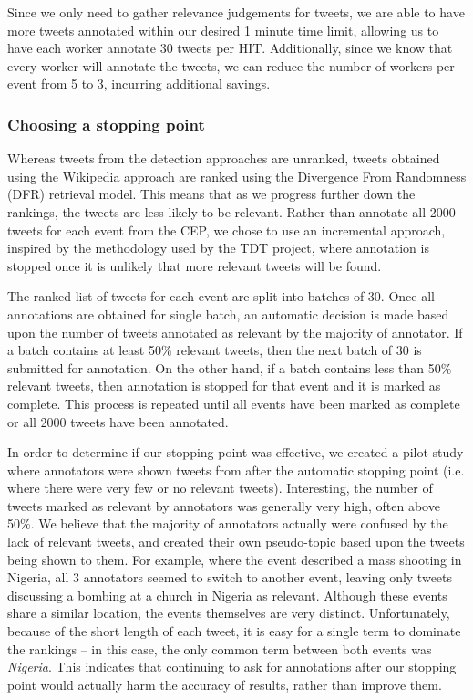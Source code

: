 Since we only need to gather relevance judgements for tweets, we are able to have more tweets annotated within our desired 1 minute time limit, allowing us to have each worker annotate 30 tweets per HIT.
Additionally, since we know that every worker will annotate the tweets, we can reduce the number of workers per event from 5 to 3, incurring additional savings.

\subsubsection{Choosing a stopping point}
Whereas tweets from the detection approaches are unranked, tweets obtained using the Wikipedia approach are ranked using the Divergence From Randomness (DFR) \citep{Amati02} retrieval model.
This means that as we progress further down the rankings, the tweets are less likely to be relevant.
Rather than annotate all 2000 tweets for each event from the CEP, we chose to use an incremental approach, inspired by the methodology used by the TDT project, where annotation is stopped once it is unlikely that more relevant tweets will be found.

The ranked list of tweets for each event are split into batches of 30.
Once all annotations are obtained for single batch, an automatic decision is made based upon the number of tweets annotated as relevant by the majority of annotator.
If a batch contains at least 50\% relevant tweets, then the next batch of 30 is submitted for annotation.
On the other hand, if a batch contains less than 50\% relevant tweets, then annotation is stopped for that event and it is marked as complete.
This process is repeated until all events have been marked as complete or all 2000 tweets have been annotated.

In order to determine if our stopping point was effective, we created a pilot study where annotators were shown tweets from after the automatic stopping point (i.e. where there were very few or no relevant tweets).
Interesting, the number of tweets marked as relevant by annotators was generally very high, often above 50\%.
We believe that the majority of annotators actually were confused by the lack of relevant tweets, and created their own pseudo-topic based upon the tweets being shown to them.
For example, where the event described a mass shooting in Nigeria, all 3 annotators seemed to switch to another event, leaving only tweets discussing a bombing at a church in Nigeria as relevant.
Although these events share a similar location, the events themselves are very distinct.
Unfortunately, because of the short length of each tweet, it is easy for a single term to dominate the rankings -- in this case, the only common term between both events was \emph{Nigeria}.
This indicates that continuing to ask for annotations after our stopping point would actually harm the accuracy of results, rather than improve them.

